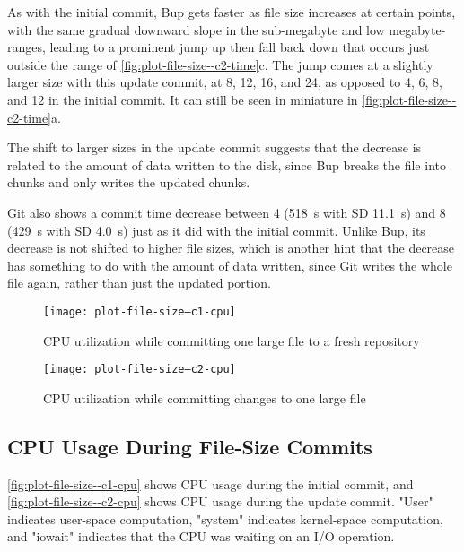 As with the initial commit, Bup gets faster as file size increases at certain
points, with the same gradual downward slope in the sub-megabyte and low
megabyte-ranges, leading to a prominent jump up then fall back down that occurs
just outside the range of \autoref{fig:plot-file-size--c2-time}c. The jump comes
at a slightly larger size with this update commit, at \num{8}, \num{12},
\num{16}, and \SI{24}{\mib}, as opposed to \num{4}, \num{6}, \num{8}, and
\SI{12}{\mib} in the initial commit. It can still be seen in miniature in
\autoref{fig:plot-file-size--c2-time}a.

The shift to larger sizes in the update
commit suggests that the decrease is related to the amount of data written to
the disk, since Bup breaks the file into chunks and only writes the updated
chunks.

Git also shows a commit time decrease between \SI{4}{\gib} (\SI{518}{\s} with SD
\SI{11.1}{\s}) and \SI{8}{\gib} (\SI{429}{\s} with SD \SI{4.0}{\s}) just as it
did with the initial commit. Unlike Bup, its decrease is not shifted to higher
file sizes, which is another hint that the decrease has something to do with the
amount of data written, since Git writes the whole file again, rather than just
the updated portion.

%


\begin{figure}[p]
    \caption{CPU utilization while committing one large file to a fresh repository}
    \label{fig:plot-file-size--c1-cpu}
    \centering
    \texttt{[image: plot-file-size--c1-cpu]}
\end{figure}

\begin{figure}[p]
    \caption{CPU utilization while committing changes to one large file}
    \label{fig:plot-file-size--c2-cpu}
    \centering
    \texttt{[image: plot-file-size--c2-cpu]}
\end{figure}

\cleardoublepage

\subsection{CPU Usage During File-Size Commits}

\autoref{fig:plot-file-size--c1-cpu} shows CPU usage during the initial
\gls{commit}, and \autoref{fig:plot-file-size--c2-cpu} shows CPU usage during
the update commit. "User" indicates user-space computation, "system" indicates
kernel-space computation, and "iowait" indicates that the CPU was waiting on an
I/O operation.

